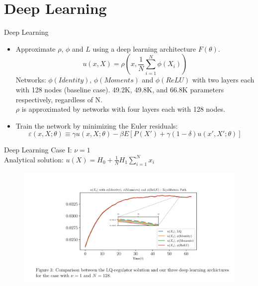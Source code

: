 \documentclass[dvipsnames,mathserif]{beamer}
\begin{document}
{\section{Deep Learning}
\begin{frame}{Deep Learning}
    \begin{itemize}
        \item Approximate $\rho$, $\phi$ and $L$ using a deep learning architecture $F(\theta)$.
        \[u(x,X) = \rho(x,\frac{1}{N}\sum_{i=1}^{N}\phi(X_i))\]
        Networks: $\phi(Identity)$, $\phi(Moments)$ and $\phi(ReLU)$ with two layers each with 128 nodes (baseline case). 49.2K, 49.8K, and 66.8K parameters respectively, regardless of N.\\
        $\rho$ is approximated by networks with four layers each with 128 nodes.
        \vspace{0.1cm}
        \item Train the network by minimizing the Euler residuals:
        \[\varepsilon(x,X;\theta) \equiv \gamma u(x,X;\theta) - \beta E[P(X') + \gamma (1-\delta)u(x',X';\theta)]\]
    \end{itemize}
\end{frame}



\begin{frame}{Deep Learning}
Case I: $\nu = 1$\\
Analytical solution: $u(X) = H_0 + \frac{1}{N}H_1\sum_{i=1}^{N}x_i$
\begin{figure}[h!]
\centering
\includegraphics[width = 1.1\textwidth]{3.png}
\end{figure}
\end{frame}

}
\end{document}
